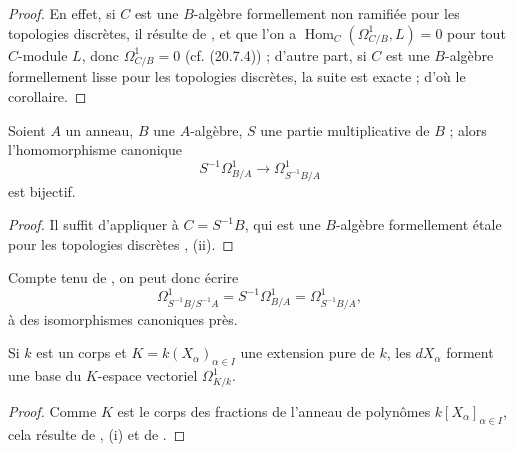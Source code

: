 \begin{proof}
En effet, si $C$ est une $B$-algèbre formellement non ramifiée pour les
topologies discrètes, il résulte de ,
 et  que l'on a
$\operatorname{Hom}_C(\Omega^1_{C/B},L)=0$ pour tout $C$-module $L$, donc
$\Omega^1_{C/B}=0$ (cf. (20.7.4)) ; d'autre part, si $C$ est une
$B$-algèbre formellement lisse pour les topologies discrètes, la suite
 est exacte ; d'où le corollaire.
\end{proof}

\begin{corollary}[20.5.9]
\label{0.20.5.9-fr}
Soient $A$ un anneau, $B$ une $A$-algèbre, $S$ une partie multiplicative de
$B$ ; alors l'homomorphisme canonique
\begin{equation}
\tag{20.5.9.1}
\label{0.20.5.9.1-fr}
  S^{-1}\Omega^1_{B/A}\to\Omega^1_{S^{-1}B/A}
\end{equation}
est bijectif.
\end{corollary}

\begin{proof}
Il suffit d'appliquer  à $C=S^{-1}B$, qui est une
$B$-algèbre formellement étale pour les topologies discrètes
, (ii).
\end{proof}

Compte tenu de , on peut donc écrire
\begin{equation}
\tag{20.5.9.2}
\label{0.20.5.9.2-fr}
  \Omega^1_{S^{-1}B/S^{-1}A}
  =S^{-1}\Omega^1_{B/A}
  =\Omega^1_{S^{-1}B/A},
\end{equation}
à des isomorphismes canoniques près.

\begin{corollary}[20.5.10]
\label{0.20.5.10-fr}
Si $k$ est un corps et $K=k(X_\alpha)_{\alpha\in I}$ une extension pure de
$k$, les $dX_\alpha$ forment une base du $K$-espace vectoriel
$\Omega^1_{K/k}$.
\end{corollary}

\begin{proof}
Comme $K$ est le corps des fractions de l'anneau de polynômes
$k[X_\alpha]_{\alpha\in I}$, cela résulte de , (i) et de
.
\end{proof}

